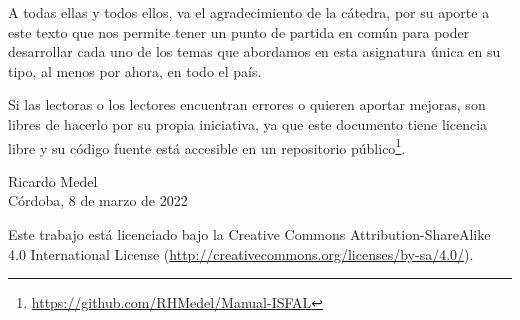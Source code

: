 A todas ellas y todos ellos, va el agradecimiento de la cátedra, por su aporte a este texto que nos permite tener un punto de partida en común para poder desarrollar cada uno de los temas que abordamos en esta asignatura única en su tipo, al menos por ahora, en todo el país.
 
Si las lectoras o los lectores encuentran errores o quieren aportar mejoras, son libres de hacerlo por su propia iniciativa, ya que este documento tiene licencia libre y su código fuente está accesible en un repositorio público\footnote{\url{https://github.com/RHMedel/Manual-ISFAL}}.

\parbox{2in}{\vspace{2in}}
\hfill
\parbox{2in}%
{Ricardo Medel\\%
Córdoba, 8 de marzo de 2022\\%
\mbox{}} 

\noindent Este trabajo está licenciado bajo la Creative Commons Attribution-ShareAlike 4.0 International License (\url{http://creativecommons.org/licenses/by-sa/4.0/}).

